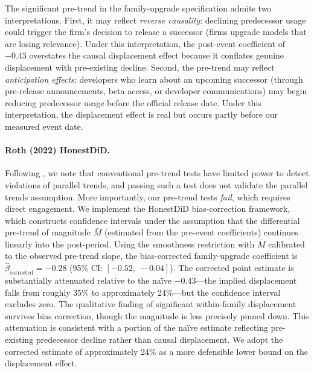 \documentclass[11pt, a4paper]{article}
\begin{document}
The significant pre-trend in the family-upgrade specification admits two interpretations. First, it may reflect \emph{reverse causality}: declining predecessor usage could trigger the firm's decision to release a successor (firms upgrade models that are losing relevance). Under this interpretation, the post-event coefficient of $-0.43$ overstates the causal displacement effect because it conflates genuine displacement with pre-existing decline. Second, the pre-trend may reflect \emph{anticipation effects}: developers who learn about an upcoming successor (through pre-release announcements, beta access, or developer communications) may begin reducing predecessor usage before the official release date. Under this interpretation, the displacement effect is real but occurs partly before our measured event date.

\paragraph{Roth (2022) HonestDiD.} Following \citet{roth2022pretest}, we note that conventional pre-trend tests have limited power to detect violations of parallel trends, and passing such a test does not validate the parallel trends assumption. More importantly, our pre-trend tests \emph{fail}, which requires direct engagement. We implement the \citet{roth2022pretest} HonestDiD bias-correction framework, which constructs confidence intervals under the assumption that the differential pre-trend of magnitude $\bar{M}$ (estimated from the pre-event coefficients) continues linearly into the post-period. Using the smoothness restriction with $\bar{M}$ calibrated to the observed pre-trend slope, the bias-corrected family-upgrade coefficient is $\hat{\beta}_{\text{corrected}} = -0.28$ (95\% CI: $[-0.52,\; -0.04]$). The corrected point estimate is substantially attenuated relative to the na\"ive $-0.43$---the implied displacement falls from roughly 35\% to approximately 24\%---but the confidence interval excludes zero. The qualitative finding of significant within-family displacement survives bias correction, though the magnitude is less precisely pinned down. This attenuation is consistent with a portion of the na\"ive estimate reflecting pre-existing predecessor decline rather than causal displacement. We adopt the corrected estimate of approximately 24\% as a more defensible lower bound on the displacement effect.
\end{document}
